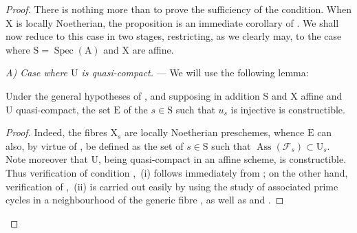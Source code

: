 \begin{proof}
There is nothing more than to prove the sufficiency of the condition.
When $\mathrm{X}$ is locally Noetherian, the proposition is an immediate corollary of .
We shall now reduce to this case in two stages, restricting, as we clearly may, to the case where $\mathrm{S}=\operatorname{Spec}(\mathrm{A})$ and $\mathrm{X}$ are affine.
\medskip

\emph{A) Case where $\mathrm{U}$ is quasi-compact.} --- We will use the following lemma:

\begin{lemma}[11.9.17.1]
\label{IV.11.9.17.1}
Under the general hypotheses of , and supposing in addition $\mathrm{S}$ and $\mathrm{X}$ affine and $\mathrm{U}$ quasi-compact, the set $\mathrm{E}$ of the $s\in\mathrm{S}$ such that $u_s$ is injective is constructible.
\end{lemma}

\begin{proof}
Indeed, the fibres $\mathrm{X}_s$ are locally Noetherian preschemes, whence $\mathrm{E}$ can also, by virtue of , be defined as the set of $s\in\mathrm{S}$ such that $\operatorname{Ass}(\mathscr{F}_s)\subset\mathrm{U}_s$.
Note moreover that $\mathrm{U}$, being quasi-compact in an affine scheme, is constructible. Thus verification of condition ,~(i) follows immediately from ; on the other hand,
verification of ,~(ii) is carried out easily by using the study of associated prime cycles in a neighbourhood of the generic fibre , as well as  and .
\end{proof}


\end{proof}
